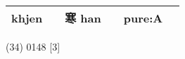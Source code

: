 \documentclass[14pt,a4paper]{scrartcl}
\begin{document}
\begin{longtable}[c]{@{}llllll@{}}
\begin{minipage}[t]{0.14\columnwidth}
khjen
\strut\end{minipage} &
\begin{minipage}[t]{0.14\columnwidth}\raggedright\strut
\strut\end{minipage} &
\begin{minipage}[t]{0.14\columnwidth}\raggedright\strut
寒 han
\strut\end{minipage} &
\begin{minipage}[t]{0.14\columnwidth}\raggedright\strut
\strut\end{minipage} &
\begin{minipage}[t]{0.14\columnwidth}\raggedright\strut
pure:A
\strut\end{minipage}\tabularnewline
\bottomrule
\end{longtable}

(34) 0148 {[}3{]}
\end{document}
